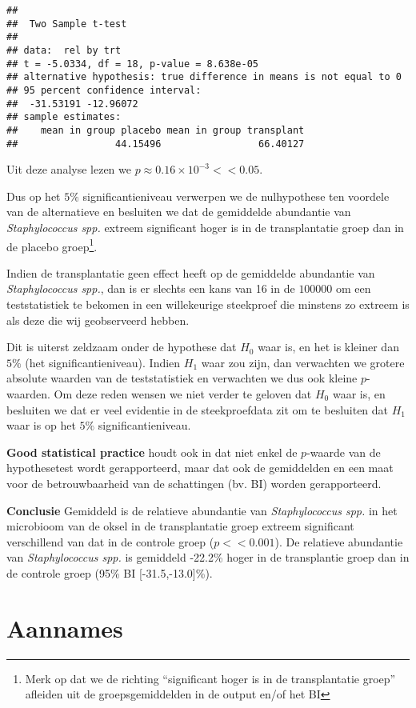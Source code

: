 \documentclass[
  12pt,dutch,coursenotes]{book}
\theoremstyle{definition}
\theoremstyle{definition}
\theoremstyle{definition}
\theoremstyle{remark}
\begin{document}
\begin{verbatim}
## 
## 	Two Sample t-test
## 
## data:  rel by trt
## t = -5.0334, df = 18, p-value = 8.638e-05
## alternative hypothesis: true difference in means is not equal to 0
## 95 percent confidence interval:
##  -31.53191 -12.96072
## sample estimates:
##    mean in group placebo mean in group transplant 
##                 44.15496                 66.40127
\end{verbatim}

Uit deze analyse lezen we \(p\approx 0.16 \times 10^{-3}<<0.05\).

Dus op het \(5\%\) significantieniveau verwerpen we de nulhypothese ten voordele van de alternatieve en besluiten we dat de gemiddelde abundantie van \emph{Staphylococcus spp.} extreem significant hoger is in de transplantatie groep dan in de placebo groep\footnote{Merk op dat we de richting ``significant hoger is in de transplantatie groep'' afleiden uit de groepsgemiddelden in de output en/of het BI}.

Indien de transplantatie geen effect heeft op de gemiddelde abundantie van \emph{Staphylococcus spp.}, dan is er slechts een kans van 16 in de \(100000\) om een teststatistiek te bekomen in een willekeurige steekproef die minstens zo extreem is als deze die wij geobserveerd hebben.

Dit is uiterst zeldzaam onder de hypothese dat \(H_0\) waar is, en het is kleiner dan \(5\%\) (het significantieniveau). Indien \(H_1\) waar zou zijn, dan verwachten we grotere absolute waarden van de teststatistiek en verwachten we dus ook kleine \(p\)-waarden. Om deze reden wensen we niet verder te geloven dat \(H_0\) waar is, en besluiten we dat er veel evidentie in de steekproefdata zit om te besluiten dat \(H_1\) waar is op het \(5\%\) significantieniveau.

\textbf{Good statistical practice} houdt ook in dat niet enkel de \(p\)-waarde van de hypothesetest wordt gerapporteerd, maar dat ook de gemiddelden en een maat voor de betrouwbaarheid van de schattingen (bv. BI) worden gerapporteerd.

\textbf{Conclusie}
Gemiddeld is de relatieve abundantie van \emph{Staphylococcus spp.} in het microbioom van de oksel in de transplantatie groep extreem significant verschillend van dat in de controle groep (\(p<<0.001\)). De relatieve abundantie van \emph{Staphylococcus spp.} is gemiddeld -22.2\% hoger in de transplantie groep dan in de controle groep (95\% BI {[}-31.5,-13.0{]}\%).

\hypertarget{aannames}{%
\section{Aannames}\label{aannames}}
\end{document}
